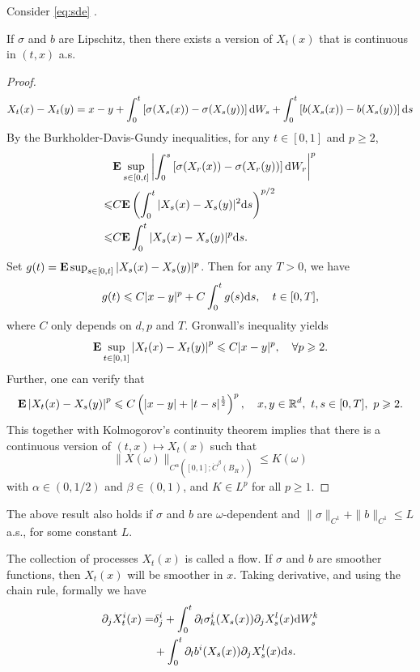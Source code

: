 Consider \eqref{eq:sde}  .   \begin{theorem}\label{Thm:flow1}
        If $\sigma$ and $b$ are Lipschitz, then there exists a version of $X_t(x)$ that is continuous in $(t,x)$ a.s.
    \end{theorem}
	\begin{proof}
	    \begin{align*}
	        X_t(x)-X_t(y)=x-y+\int_0^t \left[ \sigma(X_s(x))-\sigma(X_s(y))\right]\text{\rm{d}} W_s+ \int_0^t \left[b(X_s(x))-b(X_s(y))\right]\text{\rm{d}} s 
	    \end{align*}
     By the Burkholder-Davis-Gundy inequalities, for any $t\in[0,1]$ and \(p\geq 2\),  
\begin{align*}
    &{\mathbf E} \sup_{s\in [0,t]} \left| \int_0^s \left[\sigma(X_r(x))-\sigma(X_r(y))\right]\text{\rm{d}} W_r \right|^p\\
    \leqslant& C {\mathbf E} \left(\int_0^t |X_{s}(x)-X_s(y)|^2 \text{\rm{d}} s \right)^{p/2}\\
    \leqslant & C {\mathbf E} \int_0^t |X_{s}(x)-X_s(y)|^p \text{\rm{d}} s. 
\end{align*}
Set $g(t)={\mathbf E} \sup_{s\in [0,t]}|X_s(x)-X_s(y)|^p$. Then for any \(T>0\), we have 
\[
    g(t)\leqslant C |x-y|^p+C \int_0^t g(s) \text{\rm{d}} s, \quad t\in [0,T],  
\]
where \(C\) only depends on \(d,p\) and \(T\). Gronwall's inequality yields 
\[
    {\mathbf E} \sup_{t\in[0,1]} \left|X_t(x)-X_t(y)\right|^p \leqslant C |x-y|^p, \quad \forall p\geqslant 2. 
\]
Further, one can verify that 
\[
    {\mathbf E} \left|X_t(x)-X_s(y)\right|^p\leqslant C \left(|x-y|+|t-s|^{\frac{1}{2}}\right)^p, \quad x,y\in {\mathbb R}^d,~ t,s\in [0,T],~p\geqslant 2.
\]
This together with Kolmogorov's continuity theorem implies that there is a continuous version of $(t,x)\mapsto X_t(x)$ such that 
\[
    \|X(\omega)\|_{C^{\alpha}([0,1]; \dot C^\beta(B_R))} \leq K(\omega)
\]
with $\alpha\in (0,1/2)$ and $\beta\in(0,1)$, and $K\in L^p$ for all $p\geq 1$. 
	\end{proof}
 \begin{remark}
     The above result also holds if $\sigma$ and $b$ are $\omega$-dependent and $\|\sigma\|_{C^1}+\|b\|_{C^1}\leq L$ a.s., for some constant $L$. 
 \end{remark}
   The collection of processes $X_t(x)$ is called a flow. If $\sigma$ and $b$ are smoother functions, then $X_t(x)$ will be smoother in $x$.  Taking derivative, and using the chain rule, formally we have 
    \[
        \begin{aligned}
            \partial_j X^i_t(x) = & \delta^i_j +\int_0^t \partial_l\sigma^i_k(X_s(x))  \partial_jX^l_s(x) \text{\rm{d}} W^k_s\\
            & +\int_0^t \partial_l b^i(X_s(x))\partial_j X^l_s(x) \text{\rm{d}} s .
        \end{aligned}
    \]
    
